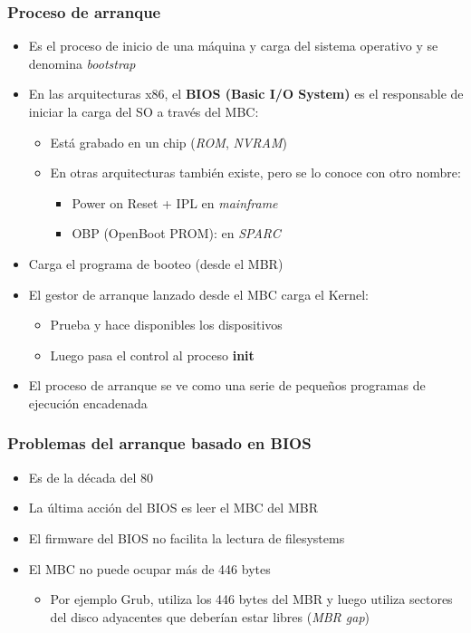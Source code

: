 \begin{frame}
	\frametitle{Proceso de arranque}
	\begin{itemize}
		\item Es el proceso de inicio de una máquina y carga del sistema operativo y se denomina \textit{bootstrap}
		\item En las arquitecturas x86, el \textbf{BIOS (Basic I/O System)} es el responsable de iniciar la carga del SO a través del MBC:
		\begin{itemize}
			\item Está grabado en un chip (\emph{ROM}, \emph{NVRAM})
			\item En otras arquitecturas también existe, pero se lo conoce con otro nombre:
			\begin{itemize}
				\item Power on Reset + IPL en \textit{mainframe}
				\item OBP (OpenBoot PROM): en \textit{SPARC}
			\end{itemize}
		\end{itemize}
		\item Carga el programa de booteo (desde el MBR)
		\item El gestor de arranque lanzado desde el MBC carga el Kernel:
		\begin{itemize}
			\item Prueba y hace disponibles los dispositivos
			\item Luego pasa el control al proceso \textbf{init}
		\end{itemize}
		\item El proceso de arranque se ve como una serie de pequeños programas de ejecución encadenada
	\end{itemize}
\end{frame}

\begin{frame}
	\frametitle{Problemas del arranque basado en BIOS}
	\begin{itemize}
		\item Es de la década del 80
		\item La última acción del BIOS es leer el MBC del MBR
		\item El firmware del BIOS no facilita la lectura de filesystems
		\item El MBC no puede ocupar más de 446 bytes
		\begin{itemize}
			\item Por ejemplo Grub, utiliza los 446 bytes del MBR y luego utiliza sectores del disco adyacentes que deberían estar libres (\textit{MBR gap})
		\end{itemize}
	\end{itemize}
\end{frame}

